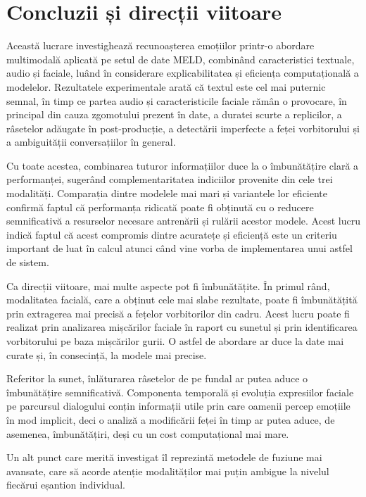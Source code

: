 \documentclass[12pt, a4paper]{article}
\begin{document}
\section{Concluzii și direcții viitoare}

Această lucrare investighează recunoașterea emoțiilor printr-o abordare multimodală aplicată pe setul de date MELD, combinând caracteristici textuale, audio și faciale, luând în considerare explicabilitatea și eficiența computațională a modelelor. Rezultatele experimentale arată că textul este cel mai puternic semnal, în timp ce partea audio și caracteristicile faciale rămân o provocare, în principal din cauza zgomotului prezent în date, a duratei scurte a replicilor, a râsetelor adăugate în post-producție, a detectării imperfecte a feței vorbitorului și a ambiguității conversațiilor în general.

Cu toate acestea, combinarea tuturor informațiilor duce la o îmbunătățire clară a performanței, sugerând complementaritatea indiciilor provenite din cele trei modalități. Comparația dintre modelele mai mari și variantele lor eficiente confirmă faptul că performanța ridicată poate fi obținută cu o reducere semnificativă a resurselor necesare antrenării și rulării acestor modele. Acest lucru indică faptul că acest compromis dintre acuratețe și eficiență este un criteriu important de luat în calcul atunci când vine vorba de implementarea unui astfel de sistem.

Ca direcții viitoare, mai multe aspecte pot fi îmbunătățite. În primul rând, modalitatea facială, care a obținut cele mai slabe rezultate, poate fi îmbunătățită prin extragerea mai precisă a fețelor vorbitorilor din cadru. Acest lucru poate fi realizat prin analizarea mișcărilor faciale în raport cu sunetul și prin identificarea vorbitorului pe baza mișcărilor gurii. O astfel de abordare ar duce la date mai curate și, în consecință, la modele mai precise.

Referitor la sunet, înlăturarea râsetelor de pe fundal ar putea aduce o îmbunătățire semnificativă. Componenta temporală și evoluția expresiilor faciale pe parcursul dialogului conțin informații utile prin care oamenii percep emoțiile în mod implicit, deci o analiză a modificării feței în timp ar putea aduce, de asemenea, îmbunătățiri, deși cu un cost computațional mai mare.

Un alt punct care merită investigat îl reprezintă metodele de fuziune mai avansate, care să acorde atenție modalităților mai puțin ambigue la nivelul fiecărui eșantion individual.

\newpage
\renewcommand{\bibname}{References}
\printbibliography[title={Bibliografie}]
\end{document}
